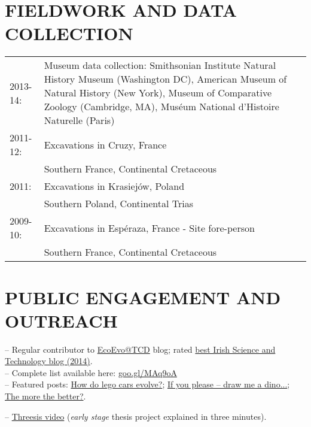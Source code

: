 \documentclass[10pt,a4paper]{article}
\begin{document}
{\section{FIELDWORK AND DATA COLLECTION}
\begin{tabular}{lp{14cm}}
2013-14: & Museum data collection: Smithsonian Institute Natural History Museum (Washington DC), American Museum of Natural History (New York), Museum of Comparative Zoology (Cambridge, MA), Mus\'{e}um National d'Histoire Naturelle (Paris) \\
2011-12: & Excavations in Cruzy, France \\
& Southern France, Continental Cretaceous\\
2011: & Excavations in Krasiej\'{o}w, Poland\\
& Southern Poland, Continental Trias\\
2009-10: & Excavations in Esp\'{e}raza, France - Site fore-person\\
& Southern France, Continental Cretaceous\\
\end{tabular}
\bigskip

\section{PUBLIC ENGAGEMENT AND OUTREACH}
-- Regular contributor to \href{http://www.ecoevoblog.com/}{EcoEvo@TCD} blog; rated \href{http://www.ecoevoblog.com/2014/10/06/blog-awards-winners-2014/}{best Irish Science and Technology blog (2014)}. \\
-- Complete list available here: \href{http://tguillerme.github.io/outreach.html}{goo.gl/MAq9oA}\\
-- Featured posts: \href{http://www.ecoevoblog.com/2013/11/04/how-do-lego-cars-evolve/}{How do lego cars evolve?}; \href{http://www.ecoevoblog.com/2013/06/04/if-you-please-draw-me-a-dino/}{If you please -- draw me a dino...}; \href{http://www.ecoevoblog.com/2015/02/06/the-more-the-better/}{The more the better?}.

-- \href{http://www.youtube.com/watch?v=Y3ciaYSvbyU}{Threesis video} (\textit{early stage} thesis project explained in three minutes).\\[1.5ex]

}
\end{document}
